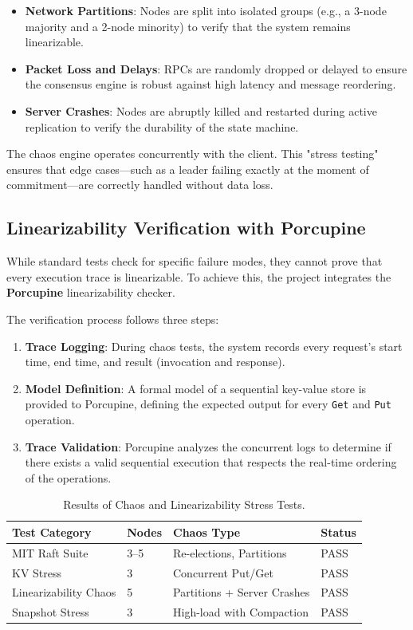 \begin{itemize}
    \item \textbf{Network Partitions}: Nodes are split into isolated groups (e.g., a 3-node majority and a 2-node minority) to verify that the system remains linearizable.
    \item \textbf{Packet Loss and Delays}: RPCs are randomly dropped or delayed to ensure the consensus engine is robust against high latency and message reordering.
    \item \textbf{Server Crashes}: Nodes are abruptly killed and restarted during active replication to verify the durability of the state machine.
\end{itemize}

The chaos engine operates concurrently with the client.
This "stress testing" ensures that edge cases—such as a leader failing exactly at the moment of commitment—are correctly handled without data loss.

\subsection{Linearizability Verification with Porcupine}
While standard tests check for specific failure modes, they cannot prove that every execution trace is linearizable. To achieve this, the project integrates the \textbf{Porcupine} linearizability checker.

The verification process follows three steps:
\begin{enumerate}
    \item \textbf{Trace Logging}: During chaos tests, the system records every request's start time, end time, and result (invocation and response).
    \item \textbf{Model Definition}: A formal model of a sequential key-value store is provided to Porcupine, defining the expected output for every \texttt{Get} and \texttt{Put} operation.
    \item \textbf{Trace Validation}: Porcupine analyzes the concurrent logs to determine if there exists a valid sequential execution that respects the real-time ordering of the operations.
\end{enumerate}

\begin{table}[h]
\centering
\caption{Results of Chaos and Linearizability Stress Tests.}
\label{tab:test_results}
\begin{tabular}{|l|l|l|l|}
\hline
\textbf{Test Category} & \textbf{Nodes} & \textbf{Chaos Type} & \textbf{Status} \\ \hline
MIT Raft Suite & 3--5 & Re-elections, Partitions & PASS \\ \hline
KV Stress & 3 & Concurrent Put/Get & PASS \\ \hline
Linearizability Chaos & 5 & Partitions + Server Crashes & PASS \\ \hline
Snapshot Stress & 3 & High-load with Compaction & PASS \\ \hline
\end{tabular}
\end{table}

